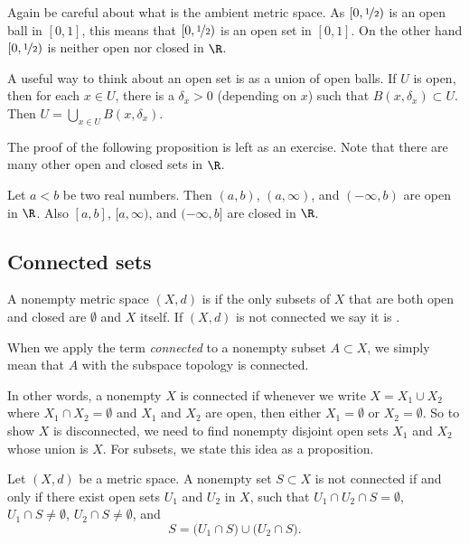 \documentclass[12pt]{book}
\begin{document}
Again be careful about what is the ambient metric space.
As $[0,\nicefrac{1}{2})$ is
an open ball in $[0,1]$, this means that $[0,\nicefrac{1}{2})$ is
an open set in $[0,1]$.
On the other hand $[0,\nicefrac{1}{2})$
is neither open nor closed in $\R$.

A useful way to think about an open set is as a union of open balls.
If $U$ is
open, then for each $x \in U$, there is a $\delta_x > 0$ (depending on $x$) such that
$B(x,\delta_x) \subset U$.
Then $U = \bigcup_{x\in U} B(x,\delta_x)$.

The proof of the following proposition is left as an exercise.
Note that
there are many other open and
closed sets in $\R$.

\begin{prop} \label{prop:topology:intervals:openclosed}
Let $a < b$ be two real numbers.
Then $(a,b)$, $(a,\infty)$,
and $(-\infty,b)$ are open in $\R$.
Also $[a,b]$, $[a,\infty)$,
and $(-\infty,b]$ are closed in $\R$.
\end{prop}


\subsection*{Connected sets}

\begin{defn}
A nonempty
metric space $(X,d)$ is \emph{} if the
only subsets of $X$ that are both open and closed are $\emptyset$ and $X$ itself.
If $(X,d)$ is not connected we say it is
\emph{}.

When we apply the term \emph{connected} to a nonempty subset $A \subset X$, we simply
mean that $A$ with the subspace topology is connected.
\end{defn}

In other words, a nonempty $X$ is connected if whenever we write
$X = X_1 \cup X_2$ where $X_1 \cap X_2 = \emptyset$ and $X_1$ and $X_2$ are
open, then either $X_1 = \emptyset$ or $X_2 = \emptyset$.
So to show $X$ is disconnected, we need to find nonempty
disjoint open sets $X_1$ and
$X_2$ whose union is $X$.
For subsets, we state this idea as a proposition.

\begin{prop}
Let $(X,d)$ be a metric space.
A nonempty set $S \subset X$ is not connected if and only if
there exist open sets $U_1$ and
$U_2$ in $X$, such that $U_1 \cap U_2 \cap S = \emptyset$,
$U_1 \cap S \not= \emptyset$,
$U_2 \cap S \not= \emptyset$, and
\begin{equation*}
S = 
\bigl( U_1 \cap S \bigr)
\cup
\bigl( U_2 \cap S \bigr) .
\end{equation*}
\end{prop}
\end{document}
